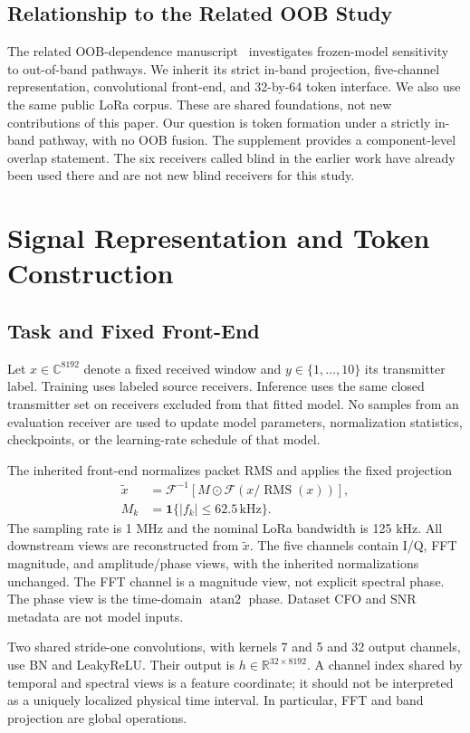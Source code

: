 \documentclass[journal]{IEEEtran}
\newcommand{\R}{\mathbb{R}}
\begin{document}
\subsection{Relationship to the Related OOB Study}
The related OOB-dependence manuscript~\cite{prioroob} investigates frozen-model sensitivity to out-of-band pathways. We inherit its strict in-band projection, five-channel representation, convolutional front-end, and 32-by-64 token interface. We also use the same public LoRa corpus. These are shared foundations, not new contributions of this paper. Our question is token formation under a strictly in-band pathway, with no OOB fusion. The supplement provides a component-level overlap statement. The six receivers called blind in the earlier work have already been used there and are not new blind receivers for this study.

\section{Signal Representation and Token Construction}
\subsection{Task and Fixed Front-End}
Let $x\in\mathbb{C}^{8192}$ denote a fixed received window and $y\in\{1,\ldots,10\}$ its transmitter label. Training uses labeled source receivers. Inference uses the same closed transmitter set on receivers excluded from that fitted model. No samples from an evaluation receiver are used to update model parameters, normalization statistics, checkpoints, or the learning-rate schedule of that model.

The inherited front-end normalizes packet RMS and applies the fixed projection
\begin{align}
 \widetilde{x}&=\mathcal{F}^{-1}\!\left[M\odot\mathcal{F}(x/\operatorname{RMS}(x))\right],\\
 M_k&=\mathbf{1}\{|f_k|\leq62.5\,\mathrm{kHz}\}.
\end{align}
The sampling rate is 1 MHz and the nominal LoRa bandwidth is 125 kHz. All downstream views are reconstructed from $\widetilde{x}$. The five channels contain I/Q, FFT magnitude, and amplitude/phase views, with the inherited normalizations unchanged. The FFT channel is a magnitude view, not explicit spectral phase. The phase view is the time-domain $\operatorname{atan2}$ phase. Dataset CFO and SNR metadata are not model inputs.

Two shared stride-one convolutions, with kernels 7 and 5 and 32 output channels, use BN and LeakyReLU. Their output is $h\in\R^{32\times8192}$. A channel index shared by temporal and spectral views is a feature coordinate; it should not be interpreted as a uniquely localized physical time interval. In particular, FFT and band projection are global operations.
\end{document}
